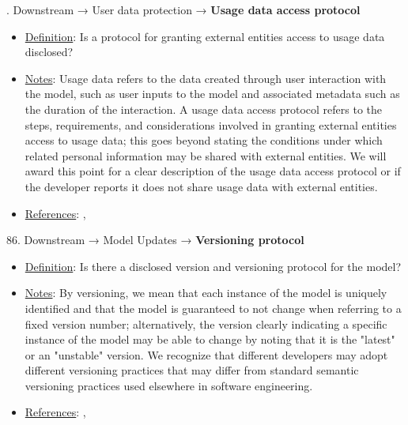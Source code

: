 . Downstream → User data protection → \textbf{Usage data access protocol}
\vspace{-\parskip}
\begin{itemize}
	\item
	\underline{Definition}: Is a protocol for granting external entities access to usage data disclosed?
	\item
	\underline{Notes}: Usage data refers to the data created through user interaction with the model, such as user inputs to the model and associated metadata such as the duration of the interaction. A usage data access protocol refers to the steps, requirements, and considerations involved in granting external entities access to usage data; this goes beyond stating the conditions under which related personal information may be shared with external entities. We will award this point for a clear description of the usage data access protocol or if the developer reports it does not share usage data with external entities.
	\item
	\underline{References}: \citet{lapowsky2018cambridge}, \citet{king2020privacy}
\end{itemize} \vspace{\baselineskip}


86. Downstream → Model Updates → \textbf{Versioning protocol}
\vspace{-\parskip}
\begin{itemize}
	\item
	\underline{Definition}: Is there a disclosed version and versioning protocol for the model?
	\item
	\underline{Notes}: By versioning, we mean that each instance of the model is uniquely identified and that the model is guaranteed to not change when referring to a fixed version number; alternatively, the version clearly indicating a specific instance of the model may be able to change by noting that it is the "latest" or an "unstable" version. We recognize that different developers may adopt different versioning practices that may differ from standard semantic versioning practices used elsewhere in software engineering.
	\item
	\underline{References}: \citet{chen2023chatgpts}, \citet{Lam2020}
\end{itemize} \vspace{\baselineskip}


